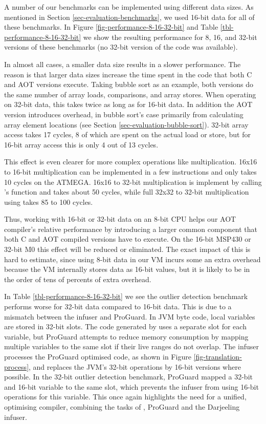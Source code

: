 A number of our benchmarks can be implemented using different data sizes. As mentioned in Section \ref{sec-evaluation-benchmarks}, we used 16-bit data for all of these benchmarks. In Figure \ref{fig-performance-8-16-32-bit} and Table \ref{tbl-performance-8-16-32-bit} we show the resulting performance for 8, 16, and 32-bit versions of these benchmarks (no 32-bit version of the  code was available).

In almost all cases, a smaller data size results in a slower performance. The reason is that larger data sizes increase the time spent in the code that both C and AOT versions execute. Taking bubble sort as an example, both versions do the same number of array loads, comparisons, and array stores. When operating on 32-bit data, this takes twice as long as for 16-bit data. In addition the AOT version introduces overhead, in bubble sort's case primarily from calculating array element locations (see Section \ref{sec-evaluation-bubble-sort}). 32-bit array access takes 17 cycles, 8 of which are spent on the actual load or store, but for 16-bit array access this is only 4 out of 13 cycles.

This effect is even clearer for more complex operations like multiplication. 16x16 to 16-bit multiplication can be implemented in a few instructions and only takes 10 cycles on the ATMEGA. 16x16 to 32-bit multiplication is implement by calling 's  function and takes about 50 cycles, while full 32x32 to 32-bit multiplication using  takes 85 to 100 cycles.

Thus, working with 16-bit or 32-bit data on an 8-bit CPU helps our AOT compiler's relative performance by introducing a larger common component that both C and AOT compiled versions have to execute. On the 16-bit MSP430 or 32-bit M0 this effect will be reduced or eliminated. The exact impact of this is hard to estimate, since using 8-bit data in our VM incurs some an extra overhead because the VM internally stores data as 16-bit values, but it is likely to be in the order of tens of percents of extra overhead.

In Table \ref{tbl-performance-8-16-32-bit} we see the outlier detection benchmark performs worse for 32-bit data compared to 16-bit data. This is due to a mismatch between the infuser and ProGuard. In JVM byte code, local variables are stored in 32-bit slots. The code generated by  uses a separate slot for each variable, but ProGuard attempts to reduce memory consumption by mapping multiple variables to the same slot if their live ranges do not overlap. The infuser processes the ProGuard optimised code, as shown in Figure \ref{fig-translation-process}, and replaces the JVM's 32-bit operations by 16-bit versions where possible. In the 32-bit outlier detection benchmark, ProGuard mapped a 32-bit and 16-bit variable to the same slot, which prevents the infuser from using 16-bit operations for this variable. This once again highlights the need for a unified, optimising compiler, combining the tasks of , ProGuard and the Darjeeling infuser.

